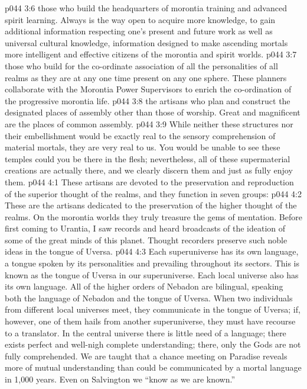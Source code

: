 \vs p044 3:6 \bibnobreakspace {} those who build the headquarters of morontia training and advanced spirit learning. Always is the way open to acquire more knowledge, to gain additional information respecting one’s present and future work as well as universal cultural knowledge, information designed to make ascending mortals more intelligent and effective citizens of the morontia and spirit worlds.
\vs p044 3:7 \bibnobreakspace {} those who build for the co\hyp{}ordinate association of all the personalities of all realms as they are at any one time present on any one sphere. These planners collaborate with the Morontia Power Supervisors to enrich the co\hyp{}ordination of the progressive morontia life.
\vs p044 3:8 \bibnobreakspace {} the artisans who plan and construct the designated places of assembly other than those of worship. Great and magnificent are the places of common assembly.
\vs p044 3:9 While neither these structures nor their embellishment would be exactly real to the sensory comprehension of material mortals, they are very real to us. You would be unable to see these temples could you be there in the flesh; nevertheless, all of these supermaterial creations are actually there, and we clearly discern them and just as fully enjoy them.
\vs p044 4:1 These artisans are devoted to the preservation and reproduction of the superior thought of the realms, and they function in seven groups:
\vs p044 4:2 \bibnobreakspace {} These are the artisans dedicated to the preservation of the higher thought of the realms. On the morontia worlds they truly treasure the gems of mentation. Before first coming to Urantia, I saw records and heard broadcasts of the ideation of some of the great minds of this planet. Thought recorders preserve such noble ideas in the tongue of Uversa.
\vs p044 4:3 Each superuniverse has its own language, a tongue spoken by its personalities and prevailing throughout its sectors. This is known as the tongue of Uversa in our superuniverse. Each local universe also has its own language. All of the higher orders of Nebadon are bilingual, speaking both the language of Nebadon and the tongue of Uversa. When two individuals from different local universes meet, they communicate in the tongue of Uversa; if, however, one of them hails from another superuniverse, they must have recourse to a translator. In the central universe there is little need of a language; there exists perfect and well\hyp{}nigh complete understanding; there, only the Gods are not fully comprehended. We are taught that a chance meeting on Paradise reveals more of mutual understanding than could be communicated by a mortal language in 1,000 years. Even on Salvington we “know as we are known.”
